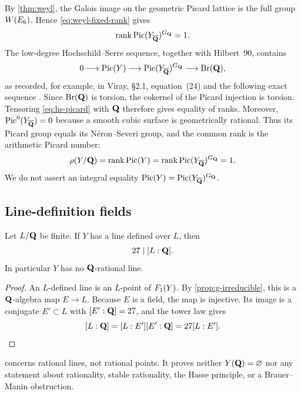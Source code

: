 By \cref{thm:weyl}, the Galois image on the geometric Picard lattice is the
full group \(W(E_6)\).  Hence \cref{eq:weyl-fixed-rank} gives
\[
 \operatorname{rank}\operatorname{Pic}(Y_{\overline{\mathbf Q}})^{G_{\mathbf Q}}=1.
\]
The low-degree Hochschild--Serre sequence, together with Hilbert~90, contains
\begin{equation}
 0\longrightarrow\operatorname{Pic}(Y)
 \longrightarrow\operatorname{Pic}(Y_{\overline{\mathbf Q}})^{G_{\mathbf Q}}
 \longrightarrow\operatorname{Br}(\mathbf Q),
\label{eq:hs-picard}
\end{equation}
as recorded, for example, in Viray, \S2.1, equation~(24) and the following
exact sequence \cite{Viray2023}.  Since \(\operatorname{Br}(\mathbf Q)\) is torsion, the cokernel
of the Picard injection is torsion.  Tensoring
\cref{eq:hs-picard} with \(\mathbf Q\) therefore gives equality of ranks.
Moreover, \(\operatorname{Pic}^0(Y_{\overline{\mathbf Q}})=0\) because a smooth cubic
surface is geometrically rational.  Thus its Picard group equals its
N\'eron--Severi group, and the common rank is the arithmetic Picard number:
\begin{equation}
 \rho(Y/\mathbf Q)
 =\operatorname{rank}\operatorname{Pic}(Y)
 =\operatorname{rank}\operatorname{Pic}(Y_{\overline{\mathbf Q}})^{G_{\mathbf Q}}
 =1.
\label{eq:arithmetic-picard}
\end{equation}
We do not assert an integral equality
\(\operatorname{Pic}(Y)=\operatorname{Pic}(Y_{\overline{\mathbf Q}})^{G_{\mathbf Q}}\).

\subsection{Line-definition fields}

\begin{corollary}
\label{cor:line-fields}
Let \(L/\mathbf Q\) be finite.  If \(Y\) has a line defined over \(L\), then
\[
 27\mid[L:\mathbf Q].
\]
In particular \(Y\) has no \(\mathbf Q\)-rational line.
\end{corollary}

\begin{proof}
An \(L\)-defined line is an \(L\)-point of \(F_1(Y)\).  By
\cref{prop:g-irreducible}, this is a \(\mathbf Q\)-algebra map \(E\to L\).
Because \(E\) is a field, the map is injective.  Its image is a conjugate
\(E'\subset L\) with \([E':\mathbf Q]=27\), and the tower law gives
\[
 [L:\mathbf Q]=[L:E'][E':\mathbf Q]=27[L:E'].
\]
\end{proof}

\begin{remark}
\label{rem:no-rationality}
 concerns rational lines, not rational points.
It proves neither \(Y(\mathbf Q)=\varnothing\) nor any statement about rationality,
stable rationality, the Hasse principle, or a Brauer--Manin obstruction.
\end{remark}

